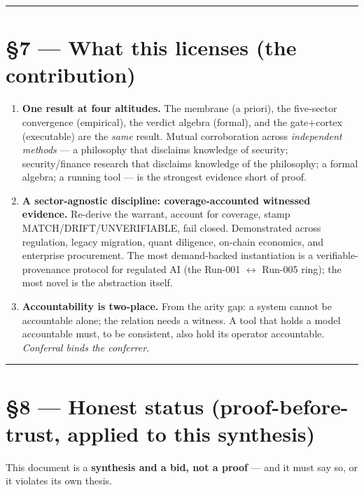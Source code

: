\documentclass[11pt]{article}
\begin{document}
\medskip\noindent\rule{\linewidth}{0.3pt}\medskip

\section*{§7 — What this licenses (the contribution)}

\begin{enumerate}
\item \textbf{One result at four altitudes.} The membrane (a priori), the five-sector convergence (empirical), the verdict algebra (formal), and the gate+cortex (executable) are the \emph{same} result. Mutual corroboration across \emph{independent methods} — a philosophy that disclaims knowledge of security; security/\allowbreak{}finance research that disclaims knowledge of the philosophy; a formal algebra; a running tool — is the strongest evidence short of proof.
\item \textbf{A sector-agnostic discipline: coverage-accounted witnessed evidence.} Re-derive the warrant, account for coverage, stamp MATCH/\allowbreak{}DRIFT/\allowbreak{}UNVERIFIABLE, fail closed. Demonstrated across regulation, legacy migration, quant diligence, on-chain economics, and enterprise procurement. The most demand-backed instantiation is a verifiable-provenance protocol for regulated AI (the Run-001 \ensuremath{\leftrightarrow} Run-005 ring); the most novel is the abstraction itself.
\item \textbf{Accountability is two-place.} From the arity gap: a system cannot be accountable alone; the relation needs a witness. A tool that holds a model accountable must, to be consistent, also hold its operator accountable. \emph{Conferral binds the conferrer.}
\end{enumerate}

\medskip\noindent\rule{\linewidth}{0.3pt}\medskip

\section*{§8 — Honest status (proof-before-trust, applied to this synthesis)}

This document is a \textbf{synthesis and a bid, not a proof} — and it must say so, or it violates its own thesis.
\end{document}
